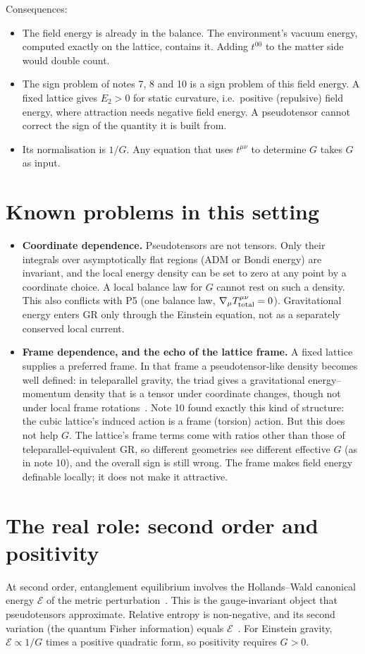 \documentclass[11pt]{article}
\begin{document}
Consequences:
\begin{itemize}
\item The field energy is already in the balance. The environment's vacuum energy, computed exactly on the lattice, contains it. Adding $t^{00}$ to the matter side would double count.
\item The sign problem of notes 7, 8 and 10 is a sign problem of this field energy. A fixed lattice gives $E_2>0$ for static curvature, i.e.\ positive (repulsive) field energy, where attraction needs negative field energy. A pseudotensor cannot correct the sign of the quantity it is built from.
\item Its normalisation is $1/G$. Any equation that uses $t^{\mu\nu}$ to determine $G$ takes $G$ as input.
\end{itemize}

\section{Known problems in this setting}
\begin{itemize}
\item \textbf{Coordinate dependence.} Pseudotensors are not tensors. Only their integrals over asymptotically flat regions (ADM or Bondi energy) are invariant, and the local energy density can be set to zero at any point by a coordinate choice. A local balance law for $G$ cannot rest on such a density. This also conflicts with P5 (one balance law, $\nabla_\mu T^{\mu\nu}_{\rm total}=0$). Gravitational energy enters GR only through the Einstein equation, not as a separately conserved local current.
\item \textbf{Frame dependence, and the echo of the lattice frame.} A fixed lattice supplies a preferred frame. In that frame a pseudotensor-like density becomes well defined: in teleparallel gravity, the triad gives a gravitational energy--momentum density that is a tensor under coordinate changes, though not under local frame rotations~\cite{AGP}. Note 10 found exactly this kind of structure: the cubic lattice's induced action is a frame (torsion) action. But this does not help $G$. The lattice's frame terms come with ratios other than those of teleparallel-equivalent GR, so different geometries see different effective $G$ (as in note 10), and the overall sign is still wrong. The frame makes field energy definable locally; it does not make it attractive.
\end{itemize}

\section{The real role: second order and positivity}
At second order, entanglement equilibrium involves the Hollands--Wald canonical energy $\mathcal E$ of the metric perturbation~\cite{HW}. This is the gauge-invariant object that pseudotensors approximate. Relative entropy is non-negative, and its second variation (the quantum Fisher information) equals $\mathcal E$~\cite{LVR,FHHPRV}. For Einstein gravity, $\mathcal E\propto 1/G$ times a positive quadratic form, so positivity requires $G>0$.
\end{document}
